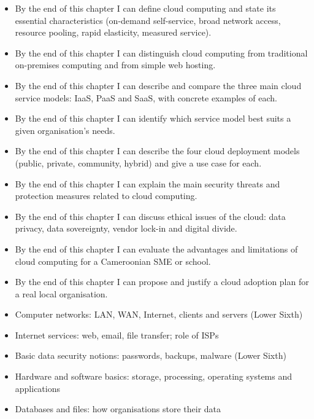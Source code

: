 \documentclass[11pt]{article}
\begin{document}
\begin{objectifs}
\begin{itemize}
\item By the end of this chapter I can define cloud computing and state its essential characteristics (on-demand self-service, broad network access, resource pooling, rapid elasticity, measured service).
\item By the end of this chapter I can distinguish cloud computing from traditional on-premises computing and from simple web hosting.
\item By the end of this chapter I can describe and compare the three main cloud service models: IaaS, PaaS and SaaS, with concrete examples of each.
\item By the end of this chapter I can identify which service model best suits a given organisation's needs.
\item By the end of this chapter I can describe the four cloud deployment models (public, private, community, hybrid) and give a use case for each.
\item By the end of this chapter I can explain the main security threats and protection measures related to cloud computing.
\item By the end of this chapter I can discuss ethical issues of the cloud: data privacy, data sovereignty, vendor lock-in and digital divide.
\item By the end of this chapter I can evaluate the advantages and limitations of cloud computing for a Cameroonian SME or school.
\item By the end of this chapter I can propose and justify a cloud adoption plan for a real local organisation.
\end{itemize}
\end{objectifs}

\begin{prerequis}
\begin{itemize}
\item Computer networks: LAN, WAN, Internet, clients and servers (Lower Sixth)
\item Internet services: web, email, file transfer; role of ISPs
\item Basic data security notions: passwords, backups, malware (Lower Sixth)
\item Hardware and software basics: storage, processing, operating systems and applications
\item Databases and files: how organisations store their data
\end{itemize}
\end{prerequis}
\end{document}
